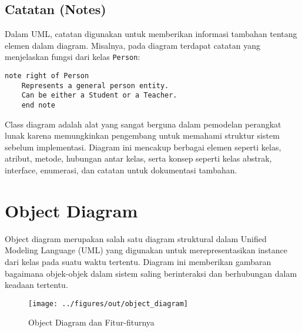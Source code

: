 \subsection{Catatan (Notes)}
Dalam UML, catatan digunakan untuk memberikan informasi tambahan tentang elemen dalam diagram. Misalnya, pada diagram terdapat catatan yang menjelaskan fungsi dari kelas \texttt{Person}:
\begin{lstlisting}[language=puml]
	note right of Person
	Represents a general person entity.
	Can be either a Student or a Teacher.
	end note
\end{lstlisting}

Class diagram adalah alat yang sangat berguna dalam pemodelan perangkat lunak karena memungkinkan pengembang untuk memahami struktur sistem sebelum implementasi. Diagram ini mencakup berbagai elemen seperti kelas, atribut, metode, hubungan antar kelas, serta konsep seperti kelas abstrak, interface, enumerasi, dan catatan untuk dokumentasi tambahan.

\section{Object Diagram}

Object diagram merupakan salah satu diagram struktural dalam Unified Modeling Language (UML) yang digunakan untuk merepresentasikan instance dari kelas pada suatu waktu tertentu. Diagram ini memberikan gambaran bagaimana objek-objek dalam sistem saling berinteraksi dan berhubungan dalam keadaan tertentu.

\begin{figure}[ht]
	\centering
	\texttt{[image: ../figures/out/object\_diagram]}
	\caption{Object Diagram dan Fitur-fiturnya}
	\label{fig:object_diagram}
\end{figure}

